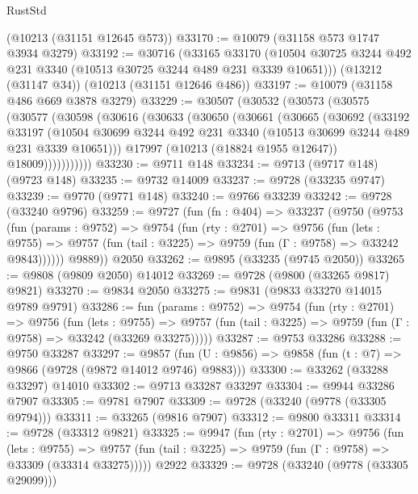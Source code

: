 \begin{lexlean}{RustStd}
\begin{coremodule}
    (@10213 (@31151 @12645 @573))
@33170 := @10079 (@31158 @573 @1747 @3934 @3279)
@33192 := @30716
    (@33165
      @33170
      (@10504 @30725 @3244 @492 @231 @3340 (@10513 @30725 @3244 @489 @231 @3339 @10651)))
    (@13212 (@31147 @34))
    (@10213 (@31151 @12646 @486))
@33197 := @10079 (@31158 @486 @669 @3878 @3279)
@33229 := @30507
    (@30532
      (@30573
        (@30575
          (@30577
            (@30598
              (@30616
                (@30633
                  (@30650
                    (@30661
                      (@30665
                        (@30692
                          (@33192
                            @33197
                            (@10504
                              @30699
                              @3244
                              @492
                              @231
                              @3340
                              (@10513 @30699 @3244 @489 @231 @3339 @10651)))
                          @17997
                          (@10213 (@18824 @1955 @12647))
                          @18009)))))))))))
@33230 := @9711 @148
@33234 := @9713 (@9717 @148) (@9723 @148)
@33235 := @9732 @14009
@33237 := @9728 (@33235 @9747)
@33239 := @9770 (@9771 @148)
@33240 := @9766 @33239
@33242 := @9728 (@33240 @9796)
@33259 := @9727
    (fun (fn : @404) =>
    @33237
      (@9750
        (@9753
          (fun (params : @9752) =>
          @9754
            (fun (rty : @2701) =>
            @9756
              (fun (lets : @9755) =>
              @9757 (fun (tail : @3225) => @9759 (fun (Γ : @9758) => @33242 @9843))))))
        @9889))
    @2050
@33262 := @9895 (@33235 (@9745 @2050))
@33265 := @9808 (@9809 @2050) @14012
@33269 := @9728 (@9800 (@33265 @9817) @9821)
@33270 := @9834 @2050
@33275 := @9831 (@9833 @33270 @14015 @9789 @9791)
@33286 := fun (params : @9752) =>
  @9754
    (fun (rty : @2701) =>
    @9756
      (fun (lets : @9755) =>
      @9757 (fun (tail : @3225) => @9759 (fun (Γ : @9758) => @33242 (@33269 @33275)))))
@33287 := @9753 @33286
@33288 := @9750 @33287
@33297 := @9857
    (fun (U : @9856) => @9858 (fun (t : @7) => @9866 (@9728 (@9872 @14012 @9746) @9883)))
@33300 := @33262 (@33288 @33297) @14010
@33302 := @9713 @33287 @33297
@33304 := @9944 @33286 @7907
@33305 := @9781 @7907
@33309 := @9728 (@33240 (@9778 (@33305 @9794)))
@33311 := @33265 (@9816 @7907)
@33312 := @9800 @33311
@33314 := @9728 (@33312 @9821)
@33325 := @9947
    (fun (rty : @2701) =>
    @9756
      (fun (lets : @9755) =>
      @9757 (fun (tail : @3225) => @9759 (fun (Γ : @9758) => @33309 (@33314 @33275)))))
    @2922
@33329 := @9728 (@33240 (@9778 (@33305 @29099)))

\end{coremodule}
\end{lexlean}
